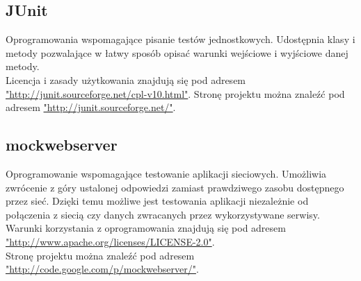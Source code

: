 \documentclass[12pt,leqno, twoside]{mwart}
\begin{document}
\subsection{JUnit}
Oprogramowania wspomagające pisanie testów jednostkowych. Udostępnia klasy i metody pozwalające w łatwy sposób opisać warunki wejściowe i wyjściowe danej metody. \\
Licencja i zasady użytkowania znajdują się pod adresem \url{"http://junit.sourceforge.net/cpl-v10.html"}.
Stronę projektu można znaleźć pod adresem \url{"http://junit.sourceforge.net/"}.
\subsection{mockwebserver}
Oprogramowanie wspomagające testowanie aplikacji sieciowych. Umożliwia zwrócenie z góry ustalonej odpowiedzi zamiast prawdziwego zasobu dostępnego przez sieć. Dzięki temu możliwe jest testowania aplikacji niezależnie od połączenia z siecią czy danych zwracanych przez wykorzystywane serwisy. \\
Warunki korzystania z oprogramowania znajdują się pod adresem \url{"http://www.apache.org/licenses/LICENSE-2.0"}. \\
Stronę projektu można znaleźć pod adresem \url{"http://code.google.com/p/mockwebserver/"}.
\end{document}
